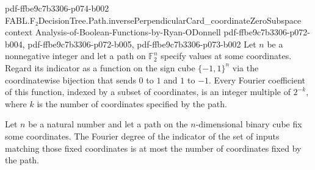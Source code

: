 \begin{theorem}
{    pdf-ffbe9c7b3306-p074-b002}
\proofstep
  {FABL.F₂DecisionTree.Path.inversePerpendicularCard_coordinateZeroSubspace}
  {context}
  {Analysis-of-Boolean-Functions-by-Ryan-ODonnell}
  {pdf-ffbe9c7b3306-p072-b004,
    pdf-ffbe9c7b3306-p072-b005,
    pdf-ffbe9c7b3306-p073-b002}
Let $n$ be a nonnegative integer and let a path on $\mathbb{F}_2^n$ specify values at
some coordinates. Regard its indicator as a function on the sign cube $\{-1,1\}^n$ via
the coordinatewise bijection that sends $0$ to $1$ and $1$ to $-1$. Every Fourier
coefficient of this function, indexed by a subset of coordinates, is an integer multiple
of $2^{-k}$, where $k$ is the number of coordinates specified by the path.
\end{theorem}

\begin{theorem}
\leanok
{}
Let $n$ be a natural number and let a path on the $n$-dimensional binary cube fix some
coordinates. The Fourier degree of the indicator of the set of inputs matching those
fixed coordinates is at most the number of coordinates fixed by the path.
\end{theorem}
